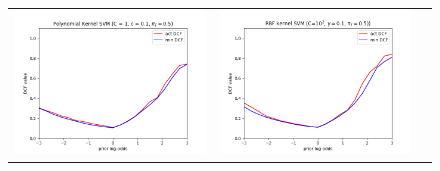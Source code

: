 \documentclass[12pt,a4paper]{article}
\begin{document}
\begin{figure}[H]
    \begin{center}
        \hspace*{-25pt}
        \begin{tabular}{ccc}
            \includegraphics[width = 200pt]{img/bayes/recalibrated-polynomial-kernel-svm.png} &
            \includegraphics[width = 200pt]{img/bayes/recalibrated-rbf-kernel-svm.png}          \\
        \end{tabular}
    \end{center}
\end{figure}
\end{document}
